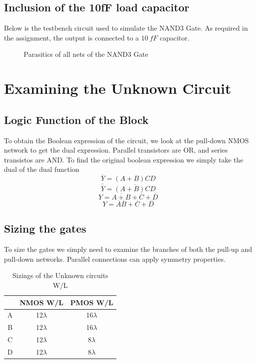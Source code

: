 \documentclass[12pt]{article}
\begin{document}
\subsection{Inclusion of the 10fF load capacitor}
Below is the testbench circuit used to simulate the NAND3 Gate. As required in the assignment, the output is connected to a $\SI{10}{fF}$ capacitor.
\begin{figure} [H]
    \centering
    \caption{Parasitics of all nets of the NAND3 Gate}
\end{figure}
\pagebreak

\section{Examining the Unknown Circuit}
\subsection{Logic Function of the Block}
To obtain the Boolean expression of the circuit, we look at the pull-down NMOS network to get the dual expression.
Parallel transistors are OR, and series transistos are AND. To find the original boolean expression we simply take the dual 
of the dual function
\[\overline{Y} = (A+B)CD \]
\[\overline{\overline{Y}} = \overline{(A+B)CD} \]
\[Y = \overline{A+B} + \overline{C} + \overline{D} \]
\[Y = \overline{A}\overline{B} + \overline{C} + \overline{D} \]
\subsection{Sizing the gates}
To size the gates we simply need to examine the branches of both the pull-up and pull-down networks.
Parallel connections can apply symmetry properties. 
\begin{table} [H]
    \centering
    \begin{tabular} {c|cc}
        &NMOS W/L&PMOS W/L\\
        \hline
        A&12$\lambda$&16$\lambda$\\
        B&12$\lambda$&16$\lambda$\\
        C&12$\lambda$&8$\lambda$\\
        D&12$\lambda$&8$\lambda$\\
    \end{tabular}
    \caption{Sizings of the Unknown circuits W/L}
\end{table}
\end{document}
